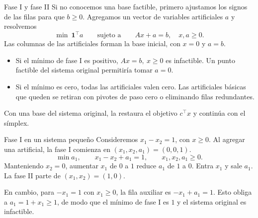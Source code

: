 \documentclass[aspectratio=169,12pt]{beamer}
\begin{document}
\begin{frame}[label=teoria-fase1]{Fase I y fase II}
Si no conocemos una base factible, primero ajustamos los signos de las
filas para que $b\ge0$. Agregamos un vector de variables artificiales $a$
y resolvemos
\[
 \min\ \mathbf 1^\top a
 \qquad\text{sujeto a}\qquad Ax+a=b,\quad x,a\ge0.
\]
Las columnas de las artificiales forman la base inicial, con $x=0$ y
$a=b$.
\begin{itemize}
\item Si el mínimo de fase I es positivo, $Ax=b,\ x\ge0$ es infactible.
      Un punto factible del sistema original permitiría tomar $a=0$.
\item Si el mínimo es cero, todas las artificiales valen cero.
      Las artificiales básicas que queden se retiran con pivotes de
      paso cero o eliminando filas redundantes.
\end{itemize}
\medskip

Con una base del sistema original, la  restaura
el objetivo $c^\top x$ y continúa con el símplex.
\end{frame}

\begin{frame}{Fase I en un sistema pequeño}
Consideremos $x_1-x_2=1$, con $x\ge0$. Al agregar una artificial,
la fase I comienza en $(x_1,x_2,a_1)=(0,0,1)$.
\[
 \min a_1,\qquad x_1-x_2+a_1=1,\qquad x_1,x_2,a_1\ge0 .
\]
Manteniendo $x_2=0$, aumentar $x_1$ de $0$ a $1$ reduce $a_1$ de $1$
a $0$. Entra $x_1$ y sale $a_1$. La fase II parte de $(x_1,x_2)=(1,0)$.
\medskip

En cambio, para $-x_1=1$ con $x_1\ge0$, la fila auxiliar es
$-x_1+a_1=1$. Esto obliga a $a_1=1+x_1\ge1$, de modo que el
mínimo de fase I es $1$ y el sistema original es infactible.
\end{frame}
\end{document}
